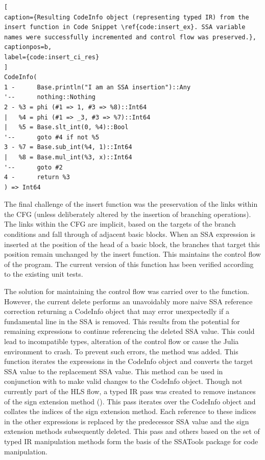 \begin{lstlisting}[
caption={Resulting CodeInfo object (representing typed IR) from the insert function in Code Snippet \ref{code:insert_ex}. SSA variable names were successfully incremented and control flow was preserved.},
captionpos=b, 
label={code:insert_ci_res}
]
CodeInfo(
1 -      Base.println("I am an SSA insertion")::Any
'--      nothing::Nothing
2 - %3 = phi (#1 => 1, #3 => %8)::Int64
|   %4 = phi (#1 => _3, #3 => %7)::Int64
|   %5 = Base.slt_int(0, %4)::Bool
'--      goto #4 if not %5
3 - %7 = Base.sub_int(%4, 1)::Int64
|   %8 = Base.mul_int(%3, x)::Int64
'--      goto #2
4 -      return %3
) => Int64
\end{lstlisting}

The final challenge of the insert function was the preservation of the links within the CFG (unless deliberately altered by the insertion of branching operations). The links within the CFG are implicit, based on the targets of the branch conditions and fall through of adjacent basic blocks. When an SSA expression is inserted at the position of the head of a basic block, the branches that target this position remain unchanged by the insert function. This maintains the control flow of the program. The current version of this function has been verified according to the existing unit tests. 

The solution for maintaining the control flow was carried over to the  function. However, the current delete performs an unavoidably more naive SSA reference correction returning a CodeInfo object that may error unexpectedly if a fundamental line in the SSA is removed. This results from the potential for remaining expressions to continue referencing the deleted SSA value. This could lead to incompatible types, alteration of the control flow or cause the Julia environment to crash. To prevent such errors, the  method was added. This function iterates the expressions in the CodeInfo object and converts the target SSA value to the replacement SSA value. This method can be used in conjunction with  to make valid changes to the CodeInfo object. Though not currently part of the HLS flow, a typed IR pass was created to remove instances of the sign extension method (). This pass iterates over the CodeInfo object and collates the indices of the sign extension method. Each reference to these indices in the other expressions is replaced by the predecessor SSA value and the sign extension methods subsequently deleted. This pass and others based on the set of typed IR manipulation methods form the basis of the SSATools package for code manipulation.

